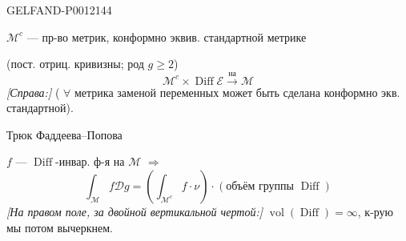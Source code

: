 \begin{GelfandAdjacentEvidence}{GELFAND-P001214}{4}


\(\mathcal M^c\) --- пр-во метрик, конформно эквив. стандартной метрике

(пост. отриц. кривизны; род \(g\geq2\))
\begin{equation*}
\mathcal M^c\times\operatorname{Diff}\mathcal E\overset{\text{на}}{\longrightarrow}\mathcal M\tag{6}
\end{equation*}
\textit{[Справа:]} ( \(\forall\) метрика заменой переменных может быть сделана конформно экв. стандартной).

Трюк Фаддеева--Попова

\(f\) --- \(\operatorname{Diff}\)-инвар. ф-я на \(\mathcal M\) \(\Rightarrow\)
\begin{equation*}
\int_{\mathcal M}f\mathcal Dg
=\left(\int_{\mathcal M^c}f\cdot\nu\right)\cdot
\left(\text{объём группы }\operatorname{Diff}\right)\tag{7}
\end{equation*}
\textit{[На правом поле, за двойной вертикальной чертой:]} \(\operatorname{vol}(\operatorname{Diff})=\infty\), к-рую мы потом вычеркнем.
\end{GelfandAdjacentEvidence}
